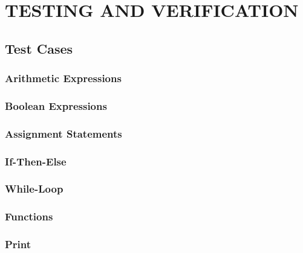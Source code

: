 \chapter{TESTING AND VERIFICATION}

\section{Test Cases}

\subsection{Arithmetic Expressions}

\subsection{Boolean Expressions}

\subsection{Assignment Statements}

\subsection{If-Then-Else}

\subsection{While-Loop}

\subsection{Functions}

\subsection{Print}

